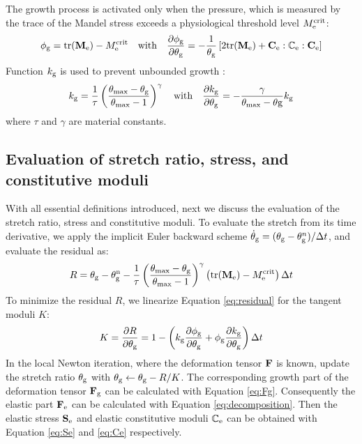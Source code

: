 The growth process is activated only when the pressure, which is measured by the trace of the Mandel stress exceeds a physiological threshold level $M_{\mathrm{e}}^{\mathrm{crit}}$:
\begin{equation}
\phi_{\mathrm{g}} = \mathrm{tr}(\bold{M}_{\mathrm{e}}) - M_{\mathrm{e}}^{\mathrm{crit}} \quad \mathrm{with} \quad \frac{\partial \phi_{\mathrm{g}}}{\partial \theta_{\mathrm{g}}} = -\frac{1}{\theta_{\mathrm{g}}} \left[2\mathrm{tr}(\bold{M}_{\mathrm{e}}) + \bold{C}_{\mathrm{e}} : \mathbb{C}_{\mathrm{e}} : \bold{C}_{\mathrm{e}}\right]
\end{equation}
Function $k_{\mathrm{g}}$ is used to prevent unbounded growth \cite{Lubarda2}:
\begin{equation}
k_{\mathrm{g}} = \frac{1}{\tau}\left( \frac{\theta_\mathrm{max} - \theta_{\mathrm{g}}}{\theta_\mathrm{max} - 1} \right)^\gamma
\quad \mathrm{with} \quad 
\frac{\partial k_{\mathrm{g}}}{\partial \theta_{\mathrm{g}}} = -\frac{\gamma}{\theta_\mathrm{max} - \theta\mathrm{g}}k_{\mathrm{g}}
\end{equation}
where $\tau$ and $\gamma$ are material constants.

\subsection{Evaluation of stretch ratio, stress, and constitutive moduli}
With all essential definitions introduced, next we discuss the evaluation of the stretch ratio, stress and constitutive moduli. To evaluate the stretch from its time derivative, we apply the implicit Euler backward scheme $\dot\theta_{\mathrm{g}} = (\theta_{\mathrm{g}} - \theta_{\mathrm{g}}^n)/\Delta t$, and evaluate the residual as:
\begin{equation} \label{eq:residual}
R = \theta_{\mathrm{g}} - \theta_{\mathrm{g}}^\mathrm{n} - \frac{1}{\tau}\left( \frac{\theta_\mathrm{max} - \theta_{\mathrm{g}}}{\theta_\mathrm{max} - 1} \right)^\gamma\left(\mathrm{tr}(\bold{M}_{\mathrm{e}}) - M_{\mathrm{e}}^{\mathrm{crit}}\right)\Delta t
\end{equation}
To minimize the residual $R$, we linearize Equation \ref{eq:residual} for the tangent moduli $K$:
\begin{equation} \label{eq:K}
K = \frac{\partial R}{\partial \theta_{\mathrm{g}}} =  1 - \left( k_{\mathrm{g}} \frac{\partial \phi_{\mathrm{g}}}{\partial \theta_{\mathrm{g}}} + \phi_{\mathrm{g}} \frac{\partial k_{\mathrm{g}}}{\partial \theta_{\mathrm{g}}} \right)\Delta t
\end{equation}
In the local Newton iteration, where the deformation tensor $\bold{F}$ is known, update the stretch ratio $\theta_{\mathrm{g}}$ with $\theta_{\mathrm{g}} \leftarrow \theta_{\mathrm{g}} - R/K$. The corresponding growth part of the deformation tensor $\bold{F}_{\mathrm{g}}$ can be calculated with Equation \ref{eq:Fg}. Consequently the elastic part $\bold{F}_{\mathrm{e}}$ can be calculated with Equation \ref{eq:decomposition}. Then the elastic stress $\bold{S}_{\mathrm{e}}$ and elastic constitutive moduli $\mathbb{C}_{\mathrm{e}}$ can be obtained with Equation \ref{eq:Se} and \ref{eq:Ce} respectively.

